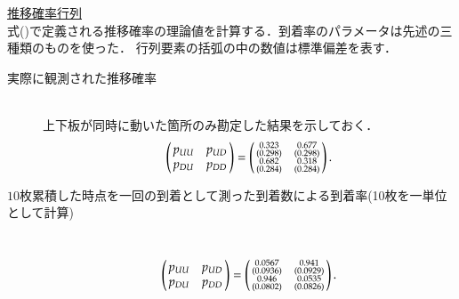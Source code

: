 \documentclass[a4j,papersize,disablejfam,slide,14pt]{jsarticle}
\begin{document}
\underline{\large 推移確率行列}\\
	式()で定義される推移確率の理論値を計算する．到着率のパラメータは先述の三種類のものを使った．
    行列要素の括弧の中の数値は標準偏差を表す．
    \begin{description}
    	\item[実際に観測された推移確率]\mbox{}\\
        	上下板が同時に動いた箇所のみ勘定した結果を示しておく．
        	\begin{align}
    			\left(
    			\begin{array}{@{\,}cc@{\,}}
    				p_{UU} & p_{UD} \\
            		p_{DU} & p_{DD}
    			\end{array}
    			\right)
                = \left(
    			\begin{array}{@{\,}cc@{\,}}
    				\substack{0.323 \\ (0.298)} & \substack{0.677 \\ (0.298)} \\
            		\substack{0.682 \\ (0.284)} & \substack{0.318 \\ (0.284)}
    			\end{array}
    			\right).
    		\end{align}

        \item[$10$枚累積した時点を一回の到着として測った到着数による到着率(10枚を一単位として計算)]\mbox{}\\
        	\begin{align}
    			\left(
    			\begin{array}{@{\,}cc@{\,}}
    				p_{UU} & p_{UD} \\
            		p_{DU} & p_{DD}
    			\end{array}
    			\right)
                = \left(
    			\begin{array}{@{\,}cc@{\,}}
    				\substack{0.0567 \\ (0.0936)} & \substack{0.941 \\ (0.0929)} \\
            		\substack{0.946 \\ (0.0802)} & \substack{0.0535 \\ (0.0826)}
    			\end{array}
    			\right).
    		\end{align}
        

\end{description}
\end{document}
